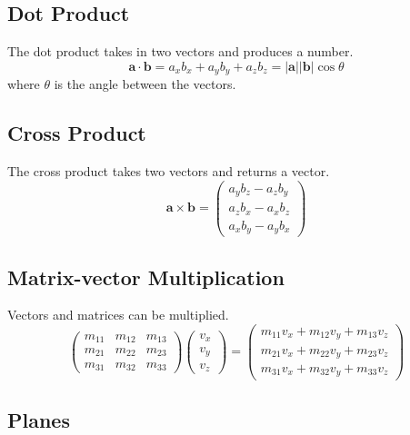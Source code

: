 \subsection{Dot Product}
The dot product takes in two vectors and produces a number.
\begin{equation}\mathbf{a} \cdot \mathbf{b} = a_x b_x + a_y b_y + a_z b_z = |\mathbf{a}||\mathbf{b}|\cos\theta\end{equation}
where $\theta$ is the angle between the vectors.

\subsection{Cross Product}
The cross product takes two vectors and returns a vector.
\begin{equation}\mathbf{a} \times \mathbf{b} = \begin{pmatrix} a_y b_z - a_z b_y \\ a_z b_x - a_x b_z \\ a_x b_y - a_y b_x \end{pmatrix}\end{equation}

\subsection{Matrix-vector Multiplication}
Vectors and matrices can be multiplied.
\begin{equation}\begin{pmatrix} m_{11} & m_{12} & m_{13} \\ m_{21} & m_{22} & m_{23} \\ m_{31} & m_{32} & m_{33} \end{pmatrix} \begin{pmatrix} v_x \\ v_y \\ v_z \end{pmatrix} = \begin{pmatrix} m_{11}v_x + m_{12}v_y + m_{13}v_z \\ m_{21}v_x + m_{22}v_y + m_{23}v_z \\ m_{31}v_x + m_{32}v_y + m_{33}v_z \end{pmatrix}\end{equation}

\subsection{Planes}

